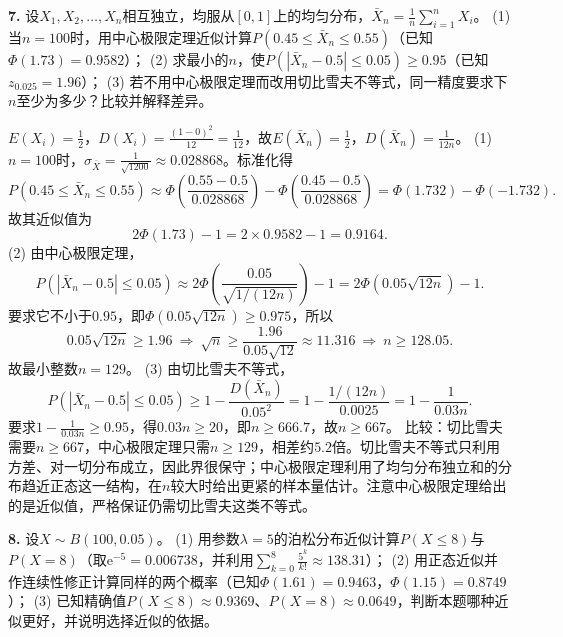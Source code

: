 \vspace{0.4cm}

\else \answerarea[10] \fi%
%
\textbf{7.} 设$X_1,X_2,\ldots,X_n$相互独立，均服从$[0,1]$上的均匀分布，$\bar X_n=\frac1n\sum_{i=1}^{n}X_i$。
(1) 当$n=100$时，用中心极限定理近似计算$P(0.45\leq\bar X_n\leq0.55)$（已知$\Phi(1.73)=0.9582$）；
(2) 求最小的$n$，使$P(|\bar X_n-0.5|\leq0.05)\geq0.95$（已知$z_{0.025}=1.96$）；
(3) 若不用中心极限定理而改用切比雪夫不等式，同一精度要求下$n$至少为多少？比较并解释差异。

\ifshowsolutions%
$E(X_i)=\frac12$，$D(X_i)=\frac{(1-0)^2}{12}=\frac1{12}$，故$E(\bar X_n)=\frac12$，$D(\bar X_n)=\frac{1}{12n}$。
(1) $n=100$时，$\sigma_{\bar X}=\frac{1}{\sqrt{1200}}\approx0.028868$。标准化得
\[
P(0.45\leq\bar X_n\leq0.55)
\approx\Phi\!\left(\frac{0.55-0.5}{0.028868}\right)-\Phi\!\left(\frac{0.45-0.5}{0.028868}\right)
=\Phi(1.732)-\Phi(-1.732).
\]
故其近似值为
\[
2\Phi(1.73)-1=2\times0.9582-1=0.9164.
\]
(2) 由中心极限定理，
\[
P(|\bar X_n-0.5|\leq0.05)
\approx2\Phi\!\left(\frac{0.05}{\sqrt{1/(12n)}}\right)-1
=2\Phi(0.05\sqrt{12n})-1.
\]
要求它不小于$0.95$，即$\Phi(0.05\sqrt{12n})\geq0.975$，所以
\[
0.05\sqrt{12n}\geq1.96
\ \Longrightarrow\ \sqrt n\geq\frac{1.96}{0.05\sqrt{12}}\approx11.316
\ \Longrightarrow\ n\geq128.05.
\]
故最小整数$n=129$。
(3) 由切比雪夫不等式，
\[
P(|\bar X_n-0.5|\leq0.05)\geq1-\frac{D(\bar X_n)}{0.05^2}
=1-\frac{1/(12n)}{0.0025}=1-\frac{1}{0.03n}.
\]
要求$1-\frac{1}{0.03n}\geq0.95$，得$0.03n\geq20$，即$n\geq666.7$，故$n\geq667$。
比较：切比雪夫需要$n\geq667$，中心极限定理只需$n\geq129$，相差约$5.2$倍。切比雪夫不等式只利用方差、对一切分布成立，因此界很保守；中心极限定理利用了均匀分布独立和的分布趋近正态这一结构，在$n$较大时给出更紧的样本量估计。注意中心极限定理给出的是近似值，严格保证仍需切比雪夫这类不等式。
\par\noindent{}

\vspace{0.4cm}

\else \answerarea[10] \fi%
%
\textbf{8.} 设$X\sim B(100,0.05)$。
(1) 用参数$\lambda=5$的泊松分布近似计算$P(X\leq8)$与$P(X=8)$（取$\mathrm{e}^{-5}=0.006738$，并利用$\sum_{k=0}^{8}\frac{5^k}{k!}\approx138.31$）；
(2) 用正态近似并作连续性修正计算同样的两个概率（已知$\Phi(1.61)=0.9463$，$\Phi(1.15)=0.8749$）；
(3) 已知精确值$P(X\leq8)\approx0.9369$、$P(X=8)\approx0.0649$，判断本题哪种近似更好，并说明选择近似的依据。

